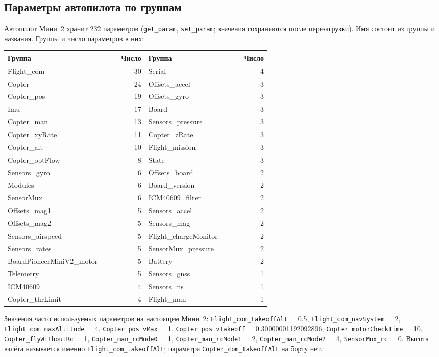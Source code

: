\subsection*{Параметры автопилота по группам}

Автопилот Мини~2 хранит 232 параметров (\verb|get_param|, \verb|set_param|; значения сохраняются после перезагрузки). Имя состоит из группы и названия. Группы и число параметров в них:

\begin{center}
\footnotesize
\begin{tabularx}{\linewidth}{@{}>{\ttfamily\raggedright\arraybackslash}p{0.3\linewidth} r >{\ttfamily\raggedright\arraybackslash}p{0.3\linewidth} r@{}}
\toprule
\textrm{\textbf{Группа}} & \textbf{Число} & \textrm{\textbf{Группа}} & \textbf{Число} \\
\midrule
Flight\_com & 30 & Serial & 4 \\
Copter & 24 & Offsets\_accel & 3 \\
Copter\_pos & 19 & Offsets\_gyro & 3 \\
Imu & 17 & Board & 3 \\
Copter\_man & 13 & Sensors\_pressure & 3 \\
Copter\_xyRate & 11 & Copter\_zRate & 3 \\
Copter\_alt & 10 & Flight\_mission & 3 \\
Copter\_optFlow & 8 & State & 3 \\
Sensors\_gyro & 6 & Offsets\_board & 2 \\
Modules & 6 & Board\_version & 2 \\
SensorMux & 6 & ICM40609\_filter & 2 \\
Offsets\_mag1 & 5 & Sensors\_accel & 2 \\
Offsets\_mag2 & 5 & Sensors\_mag & 2 \\
Sensors\_airspeed & 5 & Flight\_chargeMonitor & 2 \\
Sensors\_rates & 5 & SensorMux\_pressure & 2 \\
BoardPioneerMiniV2\_motor & 5 & Battery & 2 \\
Telemetry & 5 & Sensors\_gnss & 1 \\
ICM40609 & 4 & Sensors\_ns & 1 \\
Copter\_thrLimit & 4 & Flight\_man & 1 \\
\bottomrule
\end{tabularx}
\end{center}

Значения часто используемых параметров на настоящем Мини~2: \texttt{Flight\_com\_takeoffAlt} = 0.5, \texttt{Flight\_com\_navSystem} = 2, \texttt{Flight\_com\_maxAltitude} = 4, \texttt{Copter\_pos\_vMax} = 1, \texttt{Copter\_pos\_vTakeoff} = 0.30000001192092896, \texttt{Copter\_motorCheckTime} = 10, \texttt{Copter\_flyWithoutRc} = 1, \texttt{Copter\_man\_rcMode0} = 1, \texttt{Copter\_man\_rcMode1} = 2, \texttt{Copter\_man\_rcMode2} = 4, \texttt{SensorMux\_rc} = 0. Высота взлёта называется именно \texttt{Flight\_com\_takeoffAlt}; параметра \texttt{Copter\_com\_takeoffAlt} на борту нет.

